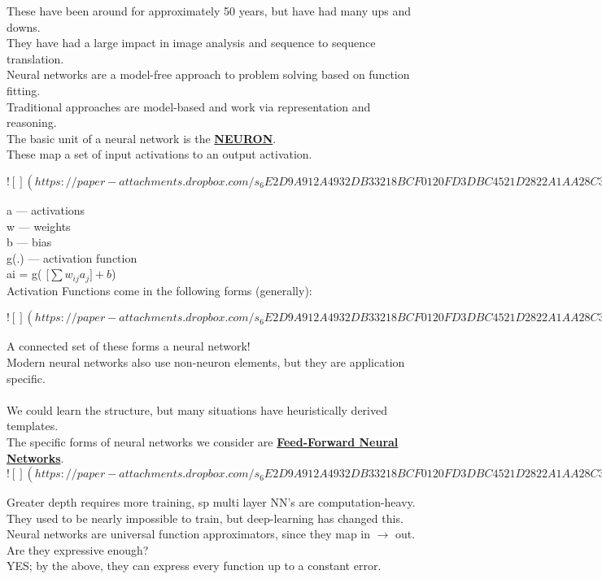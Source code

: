 \documentclass[../../lecture_notes.tex]{subfiles}
\begin{document}
\noindent These have been around for approximately 50 years, but have had many ups and downs.\\
They have had a large impact in image analysis and sequence to sequence translation.\\
Neural networks are a model-free approach to problem solving based on function fitting.\\
Traditional approaches are model-based and work via representation and reasoning.\\

\noindent The basic unit of a neural network is the \textbf{\underline{NEURON}}.\\
These map a set of input activations to an output activation.

\newpage
$![](https://paper-attachments.dropbox.com/s_6E2D9A912A4932DB33218BCF0120FD3DBC4521D2822A1AA28C3A628B5392148D_1591131415565_Untitled+drawing.jpg)$
\newpage

\noindent a — activations\\
w — weights\\
b — bias\\
g(.) — activation function\\
ai = g( [$\sum w_{ij} a_j] + b$)\\

Activation Functions come in the following forms (generally):

\newpage
$![](https://paper-attachments.dropbox.com/s_6E2D9A912A4932DB33218BCF0120FD3DBC4521D2822A1AA28C3A628B5392148D_1591132106832_Untitled+drawing+1.jpg)$
\newpage

\noindent A connected set of these forms a neural network!\\
Modern neural networks also use non-neuron elements, but they are application specific.\\
\\
We could learn the structure, but many situations have heuristically derived templates.\\
The specific forms of neural networks we consider are \textbf{\underline{Feed-Forward Neural Networks}}.\\

\newpage
$![](https://paper-attachments.dropbox.com/s_6E2D9A912A4932DB33218BCF0120FD3DBC4521D2822A1AA28C3A628B5392148D_1591132562633_Untitled+drawing+2.jpg)$
\newpage

\noindent Greater depth requires more training, sp multi layer NN’s are computation-heavy.\\
They used to be nearly impossible to train, but deep-learning has changed this.\\
Neural networks are universal function approximators, since they map in $\to$ out.\\
Are they expressive enough? \\
	\indent YES; by the above, they can express every function up to a constant error.\\
\end{document}
